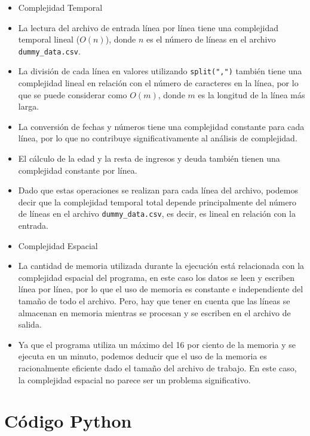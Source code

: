 \documentclass[a4paper,twocolumn,10pt]{article}
\begin{document}
\begin{itemize}
\item Complejidad Temporal


\item La lectura del archivo de entrada línea por línea tiene una complejidad temporal lineal (\(O(n)\)), donde \(n\) es el número de líneas en el archivo \texttt{dummy\_data.csv}.
    \item La división de cada línea en valores utilizando \texttt{split(",")} también tiene una complejidad lineal en relación con el número de caracteres en la línea, por lo que se puede considerar como \(O(m)\), donde \(m\) es la longitud de la línea más larga.
    \item La conversión de fechas y números tiene una complejidad constante para cada línea, por lo que no contribuye significativamente al análisis de complejidad.
    \item El cálculo de la edad y la resta de ingresos y deuda también tienen una complejidad constante por línea.
    \item Dado que estas operaciones se realizan para cada línea del archivo, podemos decir que la complejidad temporal total depende principalmente del número de líneas en el archivo \texttt{dummy\_data.csv}, es decir, es lineal en relación con la entrada.

\end{itemize}

\begin{itemize}

\item Complejidad Espacial
\item La cantidad de memoria utilizada durante la ejecución está relacionada con la complejidad espacial del programa, en este caso los datos se leen y escriben línea por línea, por lo que el uso de memoria es constante e independiente del tamaño de todo el archivo. Pero, hay que tener en cuenta que las líneas se almacenan en memoria mientras se procesan y se escriben en el archivo de salida.
\item Ya que el programa utiliza un máximo del 16 por ciento de la memoria y se ejecuta en un minuto, podemos deducir que el uso de la memoria es racionalmente eficiente dado el tamaño del archivo de trabajo. En este caso, la complejidad espacial no parece ser un problema significativo.

\end{itemize}


\section{Código Python}
\end{document}
